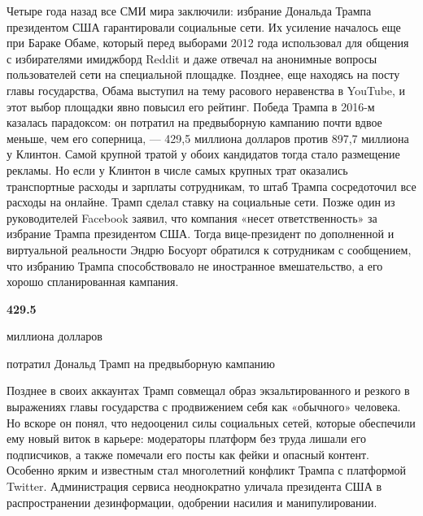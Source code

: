 Четыре года назад все СМИ мира заключили: избрание Дональда Трампа президентом
США гарантировали социальные сети. Их усиление началось еще при Бараке Обаме,
который перед выборами 2012 года использовал для общения с избирателями
имиджборд Reddit и даже отвечал на анонимные вопросы пользователей сети на
специальной площадке. Позднее, еще находясь на посту главы государства, Обама
выступил на тему расового неравенства в YouTube, и этот выбор площадки явно
повысил его рейтинг. Победа Трампа в 2016-м казалась парадоксом: он потратил на
предвыборную кампанию почти вдвое меньше, чем его соперница, — 429,5 миллиона
долларов против 897,7 миллиона у Клинтон. Самой крупной тратой у обоих
кандидатов тогда стало размещение рекламы. Но если у Клинтон в числе самых
крупных трат оказались транспортные расходы и зарплаты сотрудникам, то штаб
Трампа сосредоточил все расходы на онлайне. Трамп сделал ставку на социальные
сети. Позже один из руководителей Facebook заявил, что компания «несет
ответственность» за избрание Трампа президентом США. Тогда вице-президент по
дополненной и виртуальной реальности Эндрю Босуорт обратился к сотрудникам с
сообщением, что избранию Трампа способствовало не иностранное вмешательство, а
его хорошо спланированная кампания.

\begin{leftbar}
	\bfseries\centering
	{\Large\color{orange}429.5}\par
миллиона долларов\par
потратил Дональд Трамп на предвыборную кампанию\par
\end{leftbar}

Позднее в своих аккаунтах Трамп совмещал образ экзальтированного и резкого в
выражениях главы государства с продвижением себя как «обычного» человека. Но
вскоре он понял, что недооценил силы социальных сетей, которые обеспечили ему
новый виток в карьере: модераторы платформ без труда лишали его подписчиков, а
также помечали его посты как фейки и опасный контент. Особенно ярким и
известным стал многолетний конфликт Трампа с платформой Twitter. Администрация
сервиса неоднократно уличала президента США в распространении дезинформации,
одобрении насилия и манипулировании.

